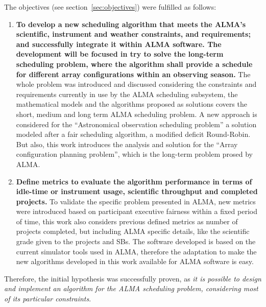 The objectives (see section~\ref{sec:objectives}) were fulfilled as follows:
\begin{enumerate}
\item \textbf{To develop a new scheduling algorithm that meets the ALMA’s scientific, instrument and
weather constraints, and requirements; and successfully integrate it within ALMA software.
The development will be focused in try to solve the long-term scheduling problem, where
the algorithm shall provide a schedule for different array configurations within an
observing season.} The whole problem was introduced and discussed considering the constraints and requirements currently in use by the ALMA scheduling subsystem, the mathematical models and the algorithms proposed as solutions covers the short, medium and long term ALMA scheduling problem. A new approach is considered for the ``Astronomical observation scheduling problem'' a solution modeled after a fair scheduling algorithm, a modified deficit Round-Robin. But also, this work introduces the analysis and solution for the ``Array configuration planning problem'', which is the long-term problem prosed by ALMA.
\item \textbf{Define metrics to evaluate the algorithm performance in terms of idle-time or instrument
usage, scientific throughput and completed projects.} To validate the specific problem presented in ALMA, new metrics were introduced based on participant executive fairness within a fixed period of time, this work also considers previous defined metrics as number of projects completed, but including ALMA specific details, like the scientific grade given to the projects and SBs. The software developed is based on the current simulator tools used in ALMA, therefore the adaptation to make the new algorithms developed in this work available for ALMA software is easy. 
\end{enumerate}

Therefore, the initial hypothesis was successfully proven, as \textit{it is possible to design and implement an algorithm for the ALMA scheduling problem, considering most of its particular constraints}.

